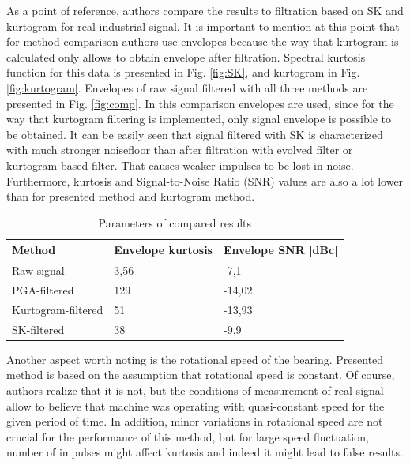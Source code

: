 \documentclass[preprint,12pt]{elsarticle}
\begin{document}
As a point of reference, authors compare the results to filtration based on SK and kurtogram for real industrial signal. It is important to mention at this point that for method comparison authors use envelopes because the way that kurtogram is calculated only allows to obtain envelope after filtration. Spectral kurtosis function for this data is presented in Fig. \ref{fig:SK}, and kurtogram in Fig. \ref{fig:kurtogram}. Envelopes of raw signal filtered with all three methods are presented in Fig. \ref{fig:comp}. In this comparison envelopes are used, since for the way that kurtogram filtering is implemented, only signal envelope is possible to be obtained. It can be easily seen that signal filtered with SK is characterized with much stronger noisefloor than after filtration with evolved filter or kurtogram-based filter. That causes weaker impulses to be lost in noise. Furthermore, kurtosis and Signal-to-Noise Ratio (SNR) values are also a lot lower than for presented method and kurtogram method.


\begin{table}[ht!]
    \centering
    \caption{Parameters of compared results}
  \begin{tabular}{|l|l|l|}
    \hline
    \textbf{Method} & \textbf{Envelope kurtosis} & \textbf{Envelope SNR [dBc]} \\ \hline
         Raw signal & 3,56 & -7,1 \\ \hline
         PGA-filtered & 129 & -14,02 \\ \hline
         Kurtogram-filtered & 51 & -13,93 \\ \hline
         SK-filtered & 38 & -9,9 \\
         
    \hline
    \end{tabular}
    \label{tab:tab3}
\end{table}

Another aspect worth noting is the rotational speed of the bearing. Presented method is based on the assumption that rotational speed is constant. Of course, authors realize that it is not, but the conditions of measurement of real signal allow to believe that machine was operating with quasi-constant speed for the given period of time. In addition, minor variations in rotational speed are not crucial for the performance of this method, but for large speed fluctuation, number of impulses might affect kurtosis and indeed it might lead to false results.
\end{document}
